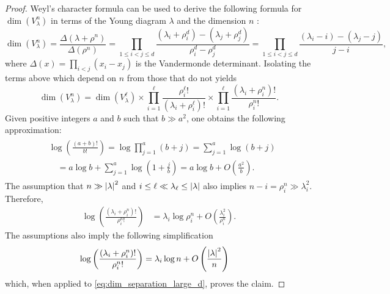 \documentclass[notitlepage, 10pt]{article}
\begin{document}
\begin{proof}
    Weyl's character formula can be used to derive the following formula for $\dim(V_{\lambda}^{n})$ in terms of the Young diagram $\lambda$ and the dimension $n$ \cite{itzykson1966unitary}:
    \begin{equation}
        \dim(V_{\lambda}^{n}) = \frac{\Delta(\lambda + \rho^n)}{\Delta(\rho^n)} = \prod_{1 \leq i<j\leq d} \frac{(\lambda_i+\rho^d_i)-(\lambda_j+\rho^d_j)}{\rho^d_i - \rho^d_j} = \prod_{1 \leq i<j\leq d} \frac{(\lambda_i-i)-(\lambda_j-j)}{j-i},
    \end{equation}
    where $\Delta(x) = \prod_{i < j}(x_i-x_j)$ is the Vandermonde determinant.
    Isolating the terms above which depend on $n$ from those that do not yields
    \begin{equation}
        \label{eq:dim_separation_large_d}
        \dim(V_{\lambda}^{n}) = \dim(V_{\lambda}^{\ell}) \times \prod_{i=1}^{\ell}\frac{\rho^{\ell}_{i}!}{(\lambda_i + \rho^{\ell}_{i}) !} \times \prod_{i=1}^{\ell} \frac{(\lambda_i+\rho^{n}_i)!}{\rho^{n}_i!}.
    \end{equation}
    Given positive integers $a$ and $b$ such that $b \gg a^2$, one obtains the following approximation:
    \begin{align}
        \begin{split}
            &\log\left(\frac{(a+b)!}{b!}\right) 
            = \log \prod_{j=1}^{a} (b+j)
            = \sum_{j=1}^{a} \log (b+j) \\
            &\quad= a \log b + \sum_{j=1}^{a} \log \left(1+\frac{j}{b}\right)
            = a \log b + O\left(\frac{a^2}{b}\right).
        \end{split}
    \end{align}
    The assumption that $n \gg \left|\lambda\right|^2$ and $i \leq \ell \ll \lambda_{\ell} \leq \left|\lambda\right|$ also implies $n - i = \rho^{n}_i \gg \lambda_i^2$.
    Therefore,
    \begin{align}
        \log\left(\frac{(\lambda_i+\rho^{n}_i)!}{\rho^{n}_i!}\right) 
        &= \lambda_i\log\rho^{n}_i + O\left(\frac{\lambda_i^2}{\rho^{n}_i}\right).
    \end{align}
    The assumptions also imply the following simplification
    \begin{align}
        \log\left(\frac{(\lambda_i+\rho^{n}_i)!}{\rho^{n}_i!}\right) 
        &= \lambda_i\log n + O\left(\frac{\left|\lambda\right|^2}{n}\right)
    \end{align}
    which, when applied to \cref{eq:dim_separation_large_d}, proves the claim.
\end{proof}
\end{document}
